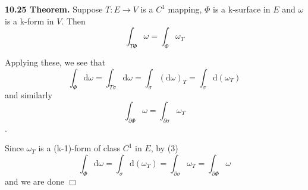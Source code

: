 \documentclass{article}
\newenvironment{myindentpar}[1]
  {\begin{list}{}
          {\setlength{\leftmargin}{#1}}
          \item[]
  }
  {\end{list}}
\begin{document}
\begin{myindentpar}{0em}
\textbf{10.25 \; Theorem. } Suppose $T: E\to V$ is a $C^1$ mapping, $\Phi$ is a k-surface in $E$ and $\omega$ is a k-form in $V$. Then
$$\int_{T\Phi} \omega = \int_\Phi \omega_T$$

Applying these, we see that
$$\int_\Phi \textrm{d}\omega = \int_{T\sigma} \textrm{d}\omega = \int_\sigma (\textrm{d}\omega)_T = \int_\sigma \textrm{d}(\omega_T)$$
and similarly
$$\int_{\partial\Phi} \omega = \int_{\partial\sigma} \omega_T$$.

Since $\omega_T$ is a (k-1)-form of class $C^1$ in $E$, by (3)
$$\int_\Phi \textrm{d}\omega = \int_\sigma \textrm{d}(\omega_T) = \int_{\partial\sigma} \omega_T = \int_{\partial\Phi} \omega$$
and we are done $\Box$
\end{myindentpar}
\end{document}
